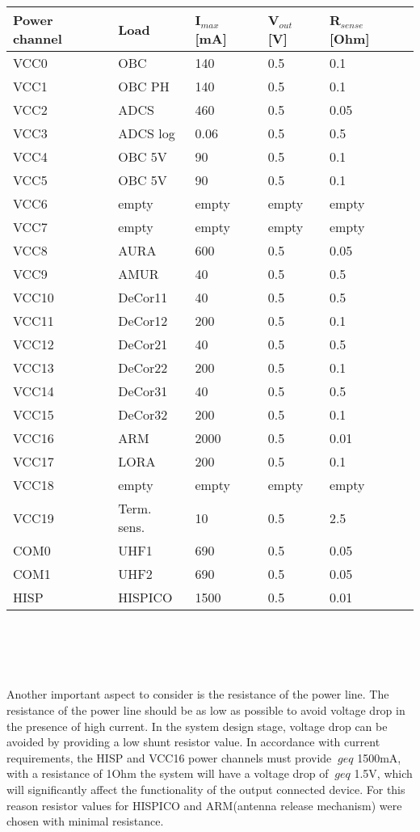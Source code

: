    \begin{tabular}{p{3cm}p{3cm}p{2cm}p{2cm}p{3cm}} \toprule
   	Power channel & Load & I$_{max}$ [mA] & V$_{out}$ [V] & R$_{sense}$ [Ohm]\\ \midrule
   VCC0 & OBC & 140 & 0.5 & 0.1\\
   VCC1 & OBC PH & 140 & 0.5 & 0.1\\
   VCC2 & ADCS & 460 & 0.5 & 0.05\\
   VCC3 & ADCS log & 0.06 & 0.5 & 0.5\\
   VCC4 & OBC 5V & 90 & 0.5 & 0.1\\
   VCC5 & OBC 5V & 90 & 0.5 & 0.1\\
   VCC6 & empty & empty & empty & empty\\
   VCC7 & empty & empty & empty & empty\\
   VCC8 & AURA & 600 & 0.5 & 0.05\\
   VCC9 & AMUR & 40 & 0.5 & 0.5\\
   VCC10 & DeCor11 & 40 & 0.5 & 0.5\\
   VCC11 & DeCor12 & 200 & 0.5 & 0.1\\ 
   VCC12 & DeCor21 & 40 & 0.5 & 0.5\\ 
   VCC13 & DeCor22 & 200 & 0.5 & 0.1\\ 
   VCC14 & DeCor31 & 40 & 0.5 & 0.5\\ 
   VCC15 & DeCor32 & 200 & 0.5 & 0.1\\ 
   VCC16 & ARM & 2000 & 0.5 & 0.01\\
   VCC17 & LORA & 200 &  0.5 & 0.1\\
   VCC18 & empty & empty & empty & empty\\
   VCC19 & Term. sens. & 10 & 0.5 & 2.5\\
   COM0 & UHF1 & 690 & 0.5 & 0.05\\
   COM1 & UHF2 & 690 & 0.5 & 0.05\\
   	HISP & HISPICO & 1500 & 0.5& 0.01\\ 
    \bottomrule
   	
   \end{tabular}\\ \\ \\ \\
  \label{Tab:res}
 Another important aspect to consider is the resistance of the power line. The resistance of the power line should be as low as possible to avoid voltage drop in the presence of high current. In the system design stage, voltage drop can be avoided by providing a low shunt resistor value. In accordance with current requirements, the HISP and VCC16 power channels must provide $ \ geq $ 1500mA, with a resistance of 1Ohm the system will have a voltage drop of $ \ geq $ 1.5V, which will significantly affect the functionality of the output connected device.
 For this reason resistor values for HISPICO and ARM(antenna release mechanism) were chosen with minimal resistance.\\ \\ 
 
